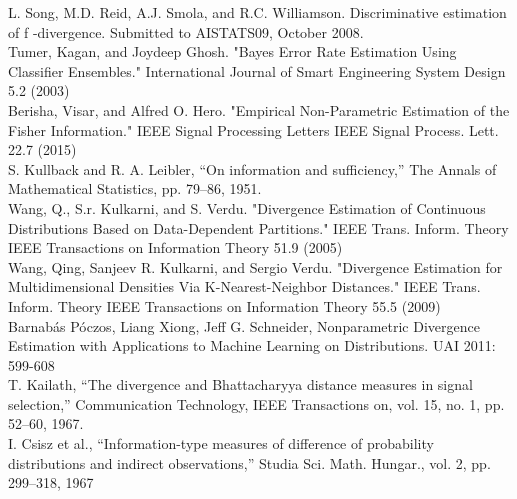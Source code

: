 \documentclass{article}
\begin{document}
	\noindent [23] L. Song, M.D. Reid, A.J. Smola, and R.C. Williamson. Discriminative estimation of f -divergence. 
	\indent Submitted to AISTATS09, October 2008.
	\\ [0.5ex]
	
	\noindent [24] Tumer, Kagan, and Joydeep Ghosh. "Bayes Error Rate Estimation Using Classifier Ensembles." 
	\indent International Journal of Smart Engineering System Design 5.2 (2003)
	\\ [0.5ex]
	
	\noindent [25] Berisha, Visar, and Alfred O. Hero. "Empirical Non-Parametric Estimation of the Fisher 
	\indent Information." IEEE Signal Processing Letters IEEE Signal Process. Lett. 22.7 (2015)
	\\ [0.5ex]
	
	\noindent [26] S. Kullback and R. A. Leibler, “On information and sufficiency,” The	Annals of Mathematical 
	\indent Statistics, pp. 79–86, 1951.
	\\ [0.5ex]
	
	\noindent [27] Wang, Q., S.r. Kulkarni, and S. Verdu. "Divergence Estimation of Continuous Distributions 
	\indent Based on Data-Dependent Partitions." IEEE Trans. Inform. Theory IEEE Transactions on 
	\indent Information Theory 51.9 (2005)
	\\ [0.5ex]
	
	\noindent [28] Wang, Qing, Sanjeev R. Kulkarni, and Sergio Verdu. "Divergence Estimation for Multidimensional 
	\indent Densities Via K-Nearest-Neighbor Distances." IEEE Trans. Inform. Theory IEEE Transactions 
	\indent on Information Theory 55.5 (2009)
	\\ [0.5ex]

	\noindent [29] Barnabás Póczos, Liang Xiong, Jeff G. Schneider, Nonparametric Divergence Estimation with 
	\indent Applications to Machine Learning on Distributions. UAI 2011: 599-608
	\\ [0.5ex]
	
	\noindent [30] T. Kailath, “The divergence and Bhattacharyya distance measures in signal selection,” Communication 
	\indent Technology, IEEE Transactions on,	vol. 15, no. 1, pp. 52–60, 1967.
	\\ [0.5ex]
	
	\noindent [31] I. Csisz et al., “Information-type measures of difference of probability	distributions and indirect 
	\indent observations,” Studia Sci. Math. Hungar.,
	vol. 2, pp. 299–318, 1967
	\\ [0.5ex]
	
\end{document}
